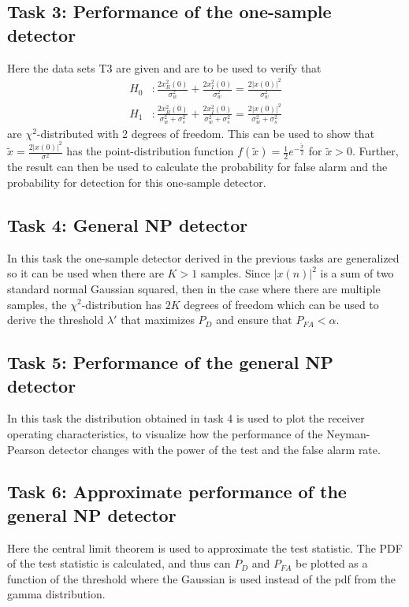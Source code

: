 \subsection{Task 3: Performance of the one-sample detector}
Here the data sets T3 are given and are to be used to verify that
\begin{align}
	H_0 &: \frac{2x_R^2(0)}{\sigma_w^2}+\frac{2x_I^2(0)}{\sigma_w^2}=\frac{2|x(0)|^2}{\sigma_w^2}\label{eq:chi_sq_h0}\\
	H_1 &: \frac{2x_R^2(0)}{\sigma_w^2+\sigma_s^2}+\frac{2x_I^2(0)}{\sigma_w^2+\sigma_s^2}=\frac{2|x(0)|^2}{\sigma_w^2+\sigma_s^2}\label{eq:chi_sq_h1}
\end{align}
are $\chi^2$-distributed with 2 degrees of freedom. This can be used to show that $\widetilde{x} = \frac{2|x(0)|^2}{\sigma^2}$ has the point-distribution function $f(\widetilde{x}) = \frac{1}{2}e^{-\frac{\widetilde{x}}{2}}$ for $\widetilde{x}>0$. Further, the result can then be used to calculate the probability for false alarm and the probability for detection for this one-sample detector.

\subsection{Task 4: General NP detector}
In this task the one-sample detector derived in the previous tasks are generalized so it can be used when there are $K>1$ samples. Since $|x(n)|^2$ is a sum of two standard normal Gaussian squared, then in the case where there are multiple samples, the $\chi^2$-distribution has $2K$ degrees of freedom which can be used to derive the threshold $\lambda'$ that maximizes $P_D$ and ensure that $P_{FA}<\alpha$.


\subsection{Task 5: Performance of the general NP detector}
In this task the distribution obtained in task 4 is used to plot the receiver operating characteristics, to visualize how the performance of the Neyman-Pearson detector changes with the power of the test and the false alarm rate.

\subsection{Task 6: Approximate performance of the general NP detector}
Here the central limit theorem is used to approximate the test statistic. The PDF of the test statistic is calculated, and thus can $P_D$ and $P_{FA}$ be plotted as a function of the threshold where the Gaussian is used instead of the pdf from the gamma distribution.

